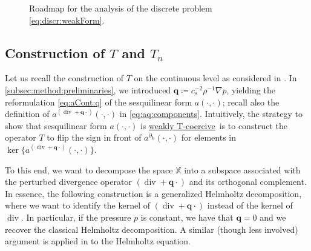 \documentclass{m2an}
\newcommand{\bflow}{\mathbf{b}}
\newcommand{\q}{\mathbf{q}} %
\renewcommand{\div}{\operatorname{div}}
\newcommand{\X}{\mathbb{X}}
\newcommand{\diffb}{\partial_{\bflow}}
\newcommand{\aconv}{a^{\diffb}}
\newcommand{\adivq}{a^{(\div+\q\cdot)}}
\newcommand{\weaklyTcoercive}{\hyperlink{weakTcoercivity}{weakly T-coercive}}
\theoremstyle{plain}
\theoremstyle{definition}
\begin{document}
\begin{figure}[!htbp]
\begin{center}
   \end{center} 
   \caption{Roadmap for the analysis of the discrete problem \eqref{eq:discr:weakForm}.} \label{fig:overview}
\end{figure}

\subsection{Construction of $T$ and $T_n$}\label{subsec:CA:Tops}
Let us recall the construction of $T$ on the continuous level as considered in \cite{H23Hdiv}. In \cref{subsec:method:preliminaries}, we introduced $\q \coloneqq c_s^{-2} \rho^{-1} \nabla p$, yielding the reformulation \eqref{eq:aCont:q} of the sesquilinear form $a(\cdot,\cdot)$; recall also the definition of $\adivq(\cdot,\cdot)$ in \eqref{eq:aq:components}. 
Intuitively, the strategy to show that sesquilinear form $a(\cdot,\cdot)$ is \weaklyTcoercive~is to construct the operator $T$ to flip the sign in front of $\aconv(\cdot,\cdot)$ for elements in $\ker\{\adivq (\cdot,\cdot) \}$. 

To this end, we want to decompose the space $\X$ into a subspace associated with the perturbed divergence operator $(\div + \q \cdot)$ and its orthogonal complement. In essence, the following construction is a generalized Helmholtz decomposition, where we want to identify the kernel of $(\div + \q \cdot)$ instead of the kernel of $\div$. In particular, if the pressure $p$ is constant, we have that $\q = 0$ and we recover the classical Helmholtz decomposition. A similar (though less involved) argument is applied in \cite[Sec.~15.1]{SBH19} to the Helmholtz equation. 
\end{document}
